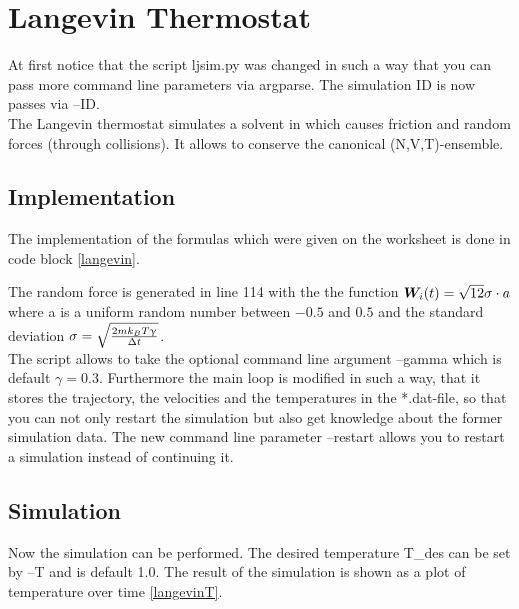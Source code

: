 \section{Langevin Thermostat}

At first notice that the script ljsim.py was changed in such a way that you can pass more command line parameters via argparse.
The simulation ID is now passes via --ID.\\

The Langevin thermostat simulates a solvent in which causes friction and random forces (through collisions).
It allows to conserve the canonical (N,V,T)-ensemble.\\

\subsection{Implementation}

The implementation of the formulas which were given on the worksheet is done in code block \ref{langevin}.


The random force is generated in line 114 with the the function $\boldsymbol{W}_i(t)=\sqrt{12}\sigma\cdot a$ where a is a uniform random number between $-0.5$ and $0.5$ and the standard deviation $\sigma =\sqrt{\frac{2mk_BT\upgamma}{\Delta t}}$.\\

The script allows to take the optional command line argument --gamma which is default $\gamma =0.3$.
Furthermore the main loop is modified in such a way, that it stores the trajectory, the velocities and the temperatures in the *.dat-file, so that you can not only restart the simulation but also get knowledge about the former simulation data.
The new command line parameter --restart allows you to restart a simulation instead of continuing it.

\subsection{Simulation}

Now the simulation can be performed. 
The desired temperature T\_des can be set by --T and is default 1.0.
The result of the simulation is shown as a plot of temperature over time \ref{langevinT}.


